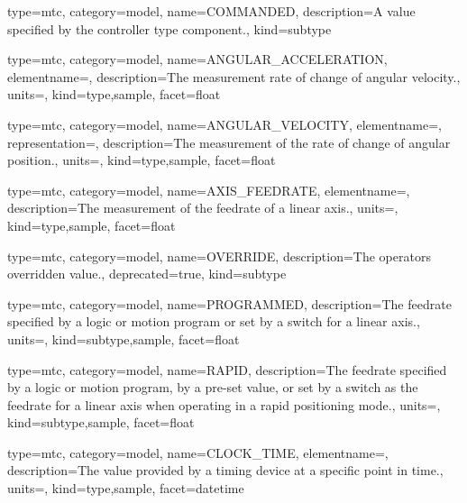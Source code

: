{
  type=mtc,
  category=model,
  name={COMMANDED},
  description={A value specified by the \gls{controller} type component.},
  kind={subtype}
}


{
  type=mtc,
  category=model,
  name={ANGULAR\_ACCELERATION},
  elementname=,
  description={The measurement rate of change of angular velocity.},
  units=,
  kind={type,sample},
  facet={\gls{float}}
}


{
  type=mtc,
  category=model,
  name={ANGULAR\_VELOCITY},
  elementname=,
  representation=,
  description={The measurement of the rate of change of angular position.},
  units=,
  kind={type,sample},
  facet={\gls{float}}
}


{
  type=mtc,
  category=model,
  name={AXIS\_FEEDRATE},
  elementname=,
  description={The measurement of the feedrate of a linear axis.},
  units=,
  kind={type,sample},
  facet={\gls{float}}
}



{
  type=mtc,
  category=model,
  name={OVERRIDE},
  description={The operators overridden value.},
  deprecated={true},
  kind={subtype}
}


{
  type=mtc,
  category=model,
  name={PROGRAMMED},
  description={The feedrate specified by a logic or motion program or set by a switch for a linear axis.},
  units=,
  kind={subtype,sample},
  facet={\gls{float}}
}


{
  type=mtc,
  category=model,
  name={RAPID},
  description={The feedrate specified by a logic or motion program, by a pre-set value, or set by a switch as the feedrate for a linear axis when operating in a rapid positioning mode.},
  units=,
  kind={subtype,sample},
  facet={\gls{float}}
}


{
  type=mtc,
  category=model,
  name={CLOCK\_TIME},
  elementname=,
  description={The value provided by a timing device at a specific point in time.},
  units=,
  kind={type,sample},
  facet={\gls{datetime}}
}


